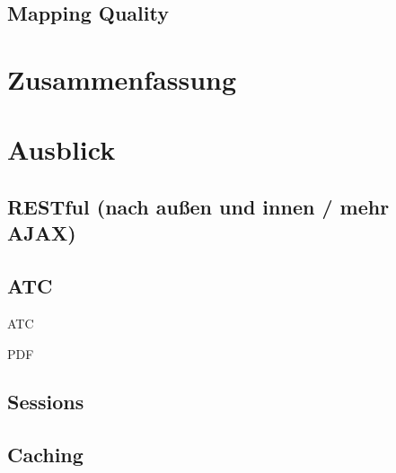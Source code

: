 \subsection{Mapping Quality}

\section{Zusammenfassung}

\section{Ausblick}

\subsection{RESTful (nach außen und innen / mehr AJAX)}

\subsection{ATC}

ATC \cite[ATC-Klassifikation]{bfarmatc}

PDF \cite{poppler}

\subsection{Sessions}

\subsection{Caching}

